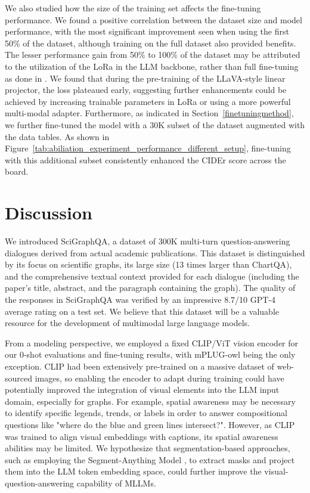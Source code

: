 \documentclass{article}
\begin{document}
We also studied how the size of the training set affects the fine-tuning performance. We found a positive correlation between the dataset size and model performance, with the most significant improvement seen when using the first 50\% of the dataset, although training on the full dataset also provided benefits. The lesser performance gain from 50\% to 100\% of the dataset may be attributed to the utilization of the LoRa in the LLM backbone, rather than full fine-tuning as done in \cite{liu2023}. We found that during the pre-training of the LLaVA-style linear projector, the loss plateaued early, suggesting further enhancements could be achieved by increasing trainable parameters in LoRa or using a more powerful multi-modal adapter. Furthermore, as indicated in Section~\ref{finetuningmethod}, we further fine-tuned the model with a 30K subset of the dataset augmented with the data tables. As shown in Figure~\ref{tab:abiliation_experiment_performance_different_setup}, fine-tuning with this additional subset consistently enhanced the CIDEr score across the board.

\section{Discussion}

We introduced SciGraphQA, a dataset of 300K multi-turn question-answering dialogues derived from actual academic publications. This dataset is distinguished by its focus on scientific graphs, its large size (13 times larger than ChartQA), and the comprehensive textual context provided for each dialogue (including the paper's title, abstract, and the paragraph containing the graph). The quality of the responses in SciGraphQA was verified by an impressive 8.7/10 GPT-4 average rating on a test set. We believe that this dataset will be a valuable resource for the development of multimodal large language models.

From a modeling perspective, we employed a fixed CLIP/ViT vision encoder for our 0-shot evaluations and fine-tuning results, with mPLUG-owl being the only exception. CLIP had been extensively pre-trained on a massive dataset of web-sourced images, so enabling the encoder to adapt during training could have potentially improved the integration of visual elements into the LLM input domain, especially for graphs. For example, spatial awareness may be necessary to identify specific legends, trends, or labels in order to answer compositional questions like "where do the blue and green lines intersect?". However, as CLIP was trained to align visual embeddings with captions, its spatial awareness abilities may be limited. We hypothesize that segmentation-based approaches, such as employing the Segment-Anything Model \cite{kirillov2023segment}, to extract masks and project them into the LLM token embedding space, could further improve the visual-question-answering capability of MLLMs.
\end{document}
